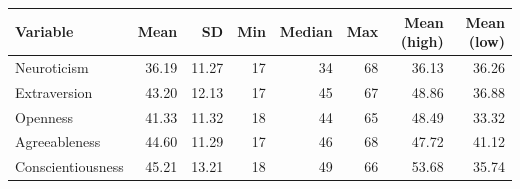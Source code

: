 \begin{tabular}{@{}l r r r r r r r@{}}
\toprule
Variable & Mean & SD & Min & Median & Max & Mean (high) & Mean (low) \\
\midrule
Neuroticism & 36.19 & 11.27 & 17 & 34 & 68 & 36.13 & 36.26 \\
Extraversion & 43.20 & 12.13 & 17 & 45 & 67 & 48.86 & 36.88 \\
Openness & 41.33 & 11.32 & 18 & 44 & 65 & 48.49 & 33.32 \\
Agreeableness & 44.60 & 11.29 & 17 & 46 & 68 & 47.72 & 41.12 \\
Conscientiousness & 45.21 & 13.21 & 18 & 49 & 66 & 53.68 & 35.74 \\
\bottomrule
\end{tabular}
